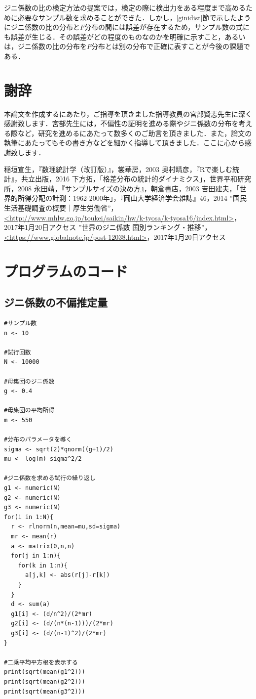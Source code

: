 \documentclass{jsarticle}
\begin{document}
ジニ係数の比の検定方法の提案では，検定の際に検出力をある程度まで高めるために必要なサンプル数を求めることができた．しかし，\ref{ginidist}節で示したようにジニ係数の比の分布と$F$分布の間には誤差が存在するため，サンプル数の式にも誤差が生じる．その誤差がどの程度のものなのかを明確に示すこと，あるいは，ジニ係数の比の分布を$F$分布とは別の分布で正確に表すことが今後の課題である．


\section*{謝辞}
本論文を作成するにあたり，ご指導を頂きました指導教員の宮部賢志先生に深く感謝致します．宮部先生には，不偏性の証明を進める際やジニ係数の分布を考える際など，研究を進めるにあたって数多くのご助言を頂きました．また，論文の執筆にあたってもその書き方などを細かく指導して頂きました．ここに心から感謝致します．


\begin{thebibliography}{99}
 稲垣宣生，『数理統計学（改訂版）』，裳華房，2003
 奥村晴彦，『Rで楽しむ統計』，共立出版，2016
 下方拓，「格差分布の統計的ダイナミクス」，世界平和研究所，2008
 永田靖，『サンプルサイズの決め方』，朝倉書店，2003
 吉田建夫，「世界的所得分配の計測：1962-2000年」，『岡山大学経済学会雑誌』46，2014
 ”国民生活基礎調査の概要｜厚生労働省”，\url{<http://www.mhlw.go.jp/toukei/saikin/hw/k-tyosa/k-tyosa16/index.html>}，2017年1月20日アクセス
 ”世界のジニ係数 国別ランキング・推移”，\url{<https://www.globalnote.jp/post-12038.html>}，2017年1月20日アクセス
\end{thebibliography}


\newpage
\appendix
\section{プログラムのコード}
\subsection{ジニ係数の不偏推定量} \label{app1}
\begin{lstlisting}
#サンプル数
n <- 10

#試行回数
N <- 10000

#母集団のジニ係数
g <- 0.4

#母集団の平均所得
m <- 550

#分布のパラメータを導く
sigma <- sqrt(2)*qnorm((g+1)/2)
mu <- log(m)-sigma^2/2

#ジニ係数を求める試行の繰り返し
g1 <- numeric(N)
g2 <- numeric(N)
g3 <- numeric(N)
for(i in 1:N){
  r <- rlnorm(n,mean=mu,sd=sigma)
  mr <- mean(r)
  a <- matrix(0,n,n)
  for(j in 1:n){
    for(k in 1:n){
      a[j,k] <- abs(r[j]-r[k])
    }
  }
  d <- sum(a)
  g1[i] <- (d/n^2)/(2*mr)
  g2[i] <- (d/(n*(n-1)))/(2*mr)
  g3[i] <- (d/(n-1)^2)/(2*mr)
}

#二乗平均平方根を表示する
print(sqrt(mean(g1^2)))
print(sqrt(mean(g2^2)))
print(sqrt(mean(g3^2)))
\end{lstlisting}
\end{document}
